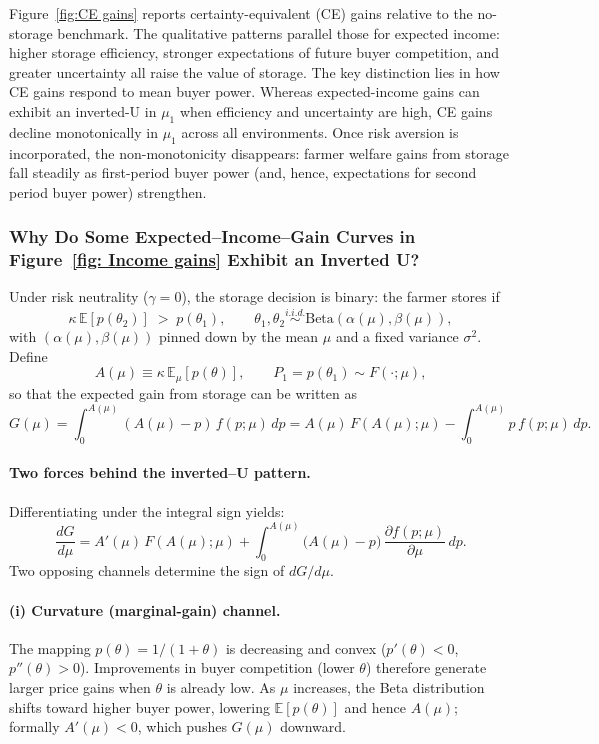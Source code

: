 Figure~\ref{fig:CE gains} reports certainty-equivalent (CE) gains relative to the no-storage benchmark. The qualitative patterns parallel those for expected income: higher storage efficiency, stronger expectations of future buyer competition, and greater uncertainty all raise the value of storage. The key distinction lies in how CE gains respond to mean buyer power. Whereas expected-income gains can exhibit an inverted-U in $\mu_1$ when efficiency and uncertainty are high, CE gains decline monotonically in $\mu_1$ across all environments. Once risk aversion is incorporated, the non-monotonicity disappears: farmer welfare gains from storage fall steadily as first-period buyer power (and, hence, expectations for second period buyer power) strengthen.


\subsubsection{Why Do Some Expected--Income--Gain Curves in Figure~\ref{fig: Income gains} Exhibit an Inverted U?}
\label{Section: Why Inverted U shapes in some Expected-Income-Gain Curves?}

\noindent
Under risk neutrality ($\gamma=0$), the storage decision is binary: the farmer stores if
$$
\kappa\,\mathbb{E}[p(\theta_2)] \;>\; p(\theta_1),
\qquad 
\theta_1,\theta_2\stackrel{i.i.d.}{\sim}\mathrm{Beta}(\alpha(\mu),\beta(\mu)),
$$
with $(\alpha(\mu),\beta(\mu))$ pinned down by the mean $\mu$ and a fixed variance $\sigma^2$. Define
$$
A(\mu)\equiv \kappa\,\mathbb{E}_{\mu}[p(\theta)],
\qquad 
P_1=p(\theta_1)\sim F(\cdot;\mu),
$$
so that the expected gain from storage can be written as
$$
G(\mu) 
= \int_{0}^{A(\mu)} (A(\mu)-p)\,f(p;\mu)\,dp
= A(\mu)\,F(A(\mu);\mu)
  - \int_{0}^{A(\mu)} p\,f(p;\mu)\,dp.
$$

\paragraph{Two forces behind the inverted--U pattern.}
Differentiating under the integral sign yields:
$$
\frac{dG}{d\mu}
= A'(\mu)\,F(A(\mu);\mu)
+ \int_{0}^{A(\mu)} \bigl(A(\mu)-p\bigr)\,\frac{\partial f(p;\mu)}{\partial \mu}\,dp.
$$
Two opposing channels determine the sign of $dG/d\mu$.

\paragraph{(i) Curvature (marginal-gain) channel.}
The mapping $p(\theta)=1/(1+\theta)$ is decreasing and convex ($p'(\theta)<0$, $p''(\theta)>0$). Improvements in buyer competition (lower $\theta$) therefore generate larger price gains when $\theta$ is already low. As $\mu$ increases, the Beta distribution shifts toward higher buyer power, lowering $\mathbb{E}[p(\theta)]$ and hence $A(\mu)$; formally $A'(\mu)<0$, which pushes $G(\mu)$ downward.

